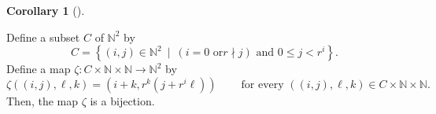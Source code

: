\documentclass[numbers=enddot,12pt,final,onecolumn,notitlepage]{scrartcl}%
\theoremstyle{definition}
\newtheorem{coro}[theo]{Corollary}
\newenvironment{corollary}[1][]
{\begin{coro}[#1]\begin{leftbar}}
{\end{leftbar}\end{coro}}
\begin{document}
\begin{corollary}
\label{cor.F-gen.bases.f.1.cor2}Define a subset $C$ of $\mathbb{N}^{2}$ by%
\begin{equation}
C=\left\{  \left(  i,j\right)  \in\mathbb{N}^{2}\ \mid\ \left(  i=0\text{ or
}r\nmid j\right)  \text{ and }0\leq j<r^{i}\right\}  .
\label{eq.cor.F-gen.bases.f.1.cor2.def-C}%
\end{equation}
Define a map $\zeta:C\times\mathbb{N}\times\mathbb{N}\rightarrow\mathbb{N}%
^{2}$ by%
\begin{equation}
\zeta\left(  \left(  i,j\right)  ,\ell,k\right)  =\left(  i+k,r^{k}\left(
j+r^{i}\ell\right)  \right)  \ \ \ \ \ \ \ \ \ \ \text{for every }\left(
\left(  i,j\right)  ,\ell,k\right)  \in C\times\mathbb{N}\times\mathbb{N}.
\label{eq.cor.F-gen.bases.f.1.cor2.def-zeta}%
\end{equation}
Then, the map $\zeta$ is a bijection.
\end{corollary}
\end{document}
